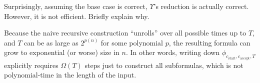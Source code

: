 \documentclass[12pt, letterpaper]{article}
\begin{document}
\begin{subproblem}{}
    Surprisingly, assuming the base case is correct, $\Upsilon$'s reduction is actually correct. However, it is not efficient. Briefly explain why.
\end{subproblem}
\begin{problemproof}
    Because the naive recursive construction “unrolls” over all possible times up to \(T\), and \(T\) can be as large as \(2^{p(n)}\) for some polynomial \(p\), the resulting formula can grow to exponential (or worse) size in \(n\). In other words, writing down \(\phi_{c_\text{start}, c_\text{accept}, T}\) explicitly requires \(\Omega(T)\) steps just to construct all subformulas, which is not polynomial-time in the length of the input.
\end{problemproof}
\end{document}
